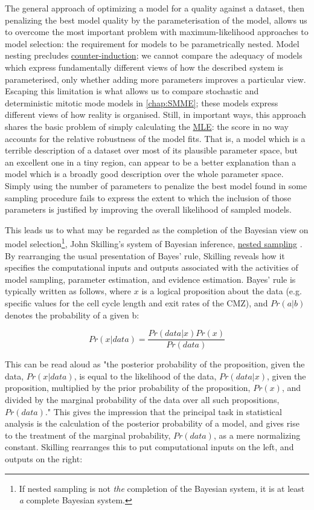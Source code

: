 The general approach of optimizing a model for a quality against a dataset, then penalizing the best model quality by the parameterisation of the model, allows us to overcome the most important problem with maximum-likelihood approaches to model selection: the requirement for models to be parametrically nested. Model nesting precludes \hyperref[sec:Feyerabend]{counter-induction}; we cannot compare the adequacy of models which express fundamentally different views of how the described system is parameterised, only whether adding more parameters improves a particular view. Escaping this limitation is what allows us to compare stochastic and deterministic mitotic mode models in \autoref{chap:SMME}; these models express different views of how reality is organised. Still, in important ways, this approach shares the basic problem of simply calculating the \hyperref[MLE]{MLE}: the score in no way accounts for the relative robustness of the model fits. That is, a model which is a terrible description of a dataset over most of its plausible parameter space, but an excellent one in a tiny region, can appear to be a better explanation than a model which is a broadly good description over the whole parameter space. Simply using the number of parameters to penalize the best model found in some sampling procedure fails to express the extent to which the inclusion of those parameters is justified by improving the overall likelihood of sampled models.

This leads us to what may be regarded as the completion of the Bayesian view on model selection\footnote{If nested sampling is not \textit{the} completion of the Bayesian system, it is at least \textit{a} complete Bayesian system.}, John Skilling's system of Bayesian inference, \hyperref[ssec:nested]{nested sampling} \cite{Skilling2006,Skilling2012,Skilling2019}. By rearranging the usual presentation of Bayes' rule, Skilling reveals how it specifies the computational inputs and outputs associated with the activities of model sampling, parameter estimation, and evidence estimation. Bayes' rule is typically written as follows, where $x$ is a logical proposition about the data (e.g. specific values for the cell cycle length and exit rates of the CMZ), and $Pr(a|b)$ denotes the probability of a given b:

\[Pr(x|data) = \frac{Pr(data|x)Pr(x)}{Pr(data)}\]

This can be read aloud as "the posterior probability of the proposition, given the data, $Pr(x|data)$, is equal to the likelihood of the data, $Pr(data|x)$, given the proposition, multiplied by the prior probability of the proposition, $Pr(x)$, and divided by the marginal probability of the data over all such propositions, $Pr(data)$." This gives the impression that the principal task in statistical analysis is the calculation of the posterior probability of a model, and gives rise to the treatment of the marginal probability, $Pr(data)$, as a mere normalizing constant. Skilling rearranges this to put computational inputs on the left, and outputs on the right:

